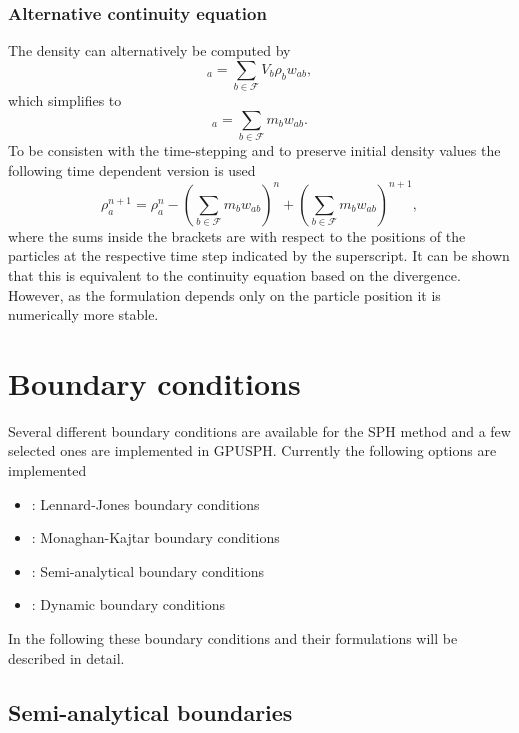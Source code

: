 \documentclass[12pt]{memoir}
\newcommand{\sumF}{\underset{b \in \mathcal{F}}{\sum}}
\begin{document}
\subsubsection{Alternative continuity equation}
The density can alternatively be computed by
\begin{equation}
[\rho]_a = \sumF V_b \rho_b w_{ab},
\end{equation}
which simplifies to
\begin{equation}
[\rho]_a = \sumF m_b w_{ab}.
\label{e:sph:sumrho}
\end{equation}
To be consisten with the time-stepping and to preserve initial density
values the following time dependent version is used
\begin{equation}
\rho_a^{n+1} = \rho_a^n - \left(\sumF m_b w_{ab}\right)^n + \left(\sumF
m_b w_{ab}\right)^{n+1},
\label{e:sph:sumrho-time}
\end{equation}
where the sums inside the brackets are with respect to the positions of
the particles at the respective time step indicated by the superscript.
It can be shown  that this is equivalent to the
continuity equation based on the divergence. However, as the formulation
depends only on the particle position it is numerically more stable.

\section{Boundary conditions}

Several different boundary conditions are available for the SPH method
and a few selected ones are implemented in GPUSPH. Currently the
following options are implemented
\begin{itemize}
  \item {}: Lennard-Jones boundary conditions
  \item {}: Monaghan-Kajtar boundary conditions
  \item {}: Semi-analytical boundary conditions
  \item {}: Dynamic boundary conditions
\end{itemize}
In the following these boundary conditions and their formulations will
be described in detail.

\subsection{Semi-analytical boundaries}
\end{document}
